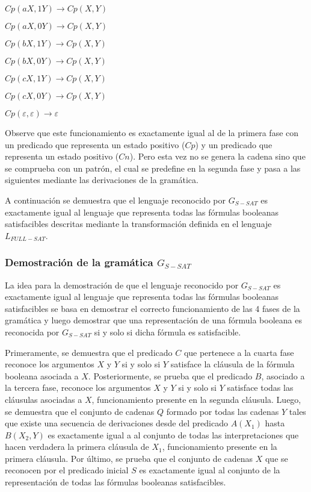 \begin{itemize}
\begin{enumerate}[start=23]
\begin{multicols}{2}
                  \item $Cp(aX,1Y) \to Cp(X,Y)$
                  \item $Cp(aX,0Y) \to Cp(X,Y)$
                  \item $Cp(bX,1Y) \to Cp(X,Y)$
                  \item $Cp(bX,0Y) \to Cp(X,Y)$
                  \item $Cp(cX,1Y) \to Cp(X,Y)$
                  \item $Cp(cX,0Y) \to Cp(X,Y)$
                  \item $Cp(\varepsilon,\varepsilon)\to \varepsilon$
              \end{multicols}
          \end{enumerate}

          Observe que este funcionamiento es exactamente igual al de la primera fase con un predicado que representa un
          estado positivo ($Cp$) y un predicado que representa un estado positivo ($Cn$). Pero esta vez no se genera
          la cadena sino que se comprueba con un patrón, el cual se predefine en la segunda fase y pasa a las
          siguientes mediante las derivaciones de la gramática.

\end{itemize}

A continuación se demuestra que el lenguaje reconocido por $G_{S-SAT}$ es exactamente igual al lenguaje que representa todas las fórmulas booleanas satisfacibles descritas mediante
la transformación definida en el lenguaje $L_{FULL-SAT}$.

\subsubsection{Demostración de la gramática $G_{S-SAT}$}

La idea para la demostración de que el lenguaje reconocido por $G_{S-SAT}$ es exactamente igual al lenguaje
que representa todas las fórmulas booleanas satisfacibles se basa en demostrar el correcto funcionamiento de las 4
fases de la gramática y luego demostrar que una representación de una fórmula booleana es reconocida por $G_{S-SAT}$
si  y solo si dicha fórmula es satisfacible.

Primeramente, se demuestra que el predicado $C$ que pertenece a la cuarta fase reconoce los argumentos $X$ y $Y$
si y solo si $Y$ satisface la cláusula de la fórmula booleana asociada a $X$. Posteriormente, se prueba que el predicado $B$,
asociado a la tercera fase, reconoce los argumentos $X$ y $Y$ si y solo si $Y$ satisface todas las cláusulas
asociadas a $X$, funcionamiento presente en la segunda cláusula.  Luego, se demuestra  que el conjunto de cadenas
$Q$ formado por todas las cadenas $Y$ tales que existe una secuencia de derivaciones desde del predicado
$A(X_1)$ hasta $B(X_2,Y)$ es exactamente igual a al conjunto de todas las interpretaciones que hacen verdadera
la primera cláusula de $X_1$, funcionamiento presente en la primera cláusula. Por último, se prueba
que el conjunto de cadenas $X$ que se reconocen por el predicado inicial $S$ es exactamente igual al
conjunto de la representación de todas las fórmulas booleanas satisfacibles.


